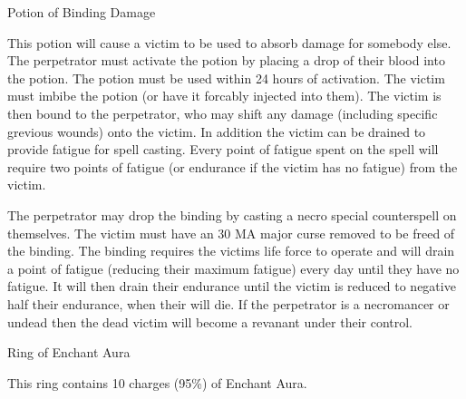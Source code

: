 \documentclass[a4paper]{article}
\begin{document}
\begin{ep-box}{Potion of Binding Damage}

This potion will cause a victim to be used to absorb damage for
somebody else.  The perpetrator must activate the potion by placing a
drop of their blood into the potion.  The potion must be used within
24 hours of activation.  The victim must imbibe the potion (or have it
forcably injected into them).  The victim is then bound to the
perpetrator, who may shift any damage (including specific grevious
wounds) onto the victim.  In addition the victim can be drained to
provide fatigue for spell casting.  Every point of fatigue spent on
the spell will require two points of fatigue (or endurance if the
victim has no fatigue) from the victim.

The perpetrator may drop the binding by casting a necro special
counterspell on themselves.  The victim must have an 30 MA major curse
removed to be freed of the binding.  The binding requires the victims
life force to operate and will drain a point of fatigue (reducing
their maximum fatigue) every day until they have no fatigue.  It will
then drain their endurance until the victim is reduced to negative
half their endurance, when their will die.  If the perpetrator is a
necromancer or undead then the dead victim will become a revanant
under their control.
\end{ep-box}


\begin{ep-box}{Ring of Enchant Aura}

This ring contains 10 charges (95\%) of Enchant Aura.
\end{ep-box}

\end{document}
